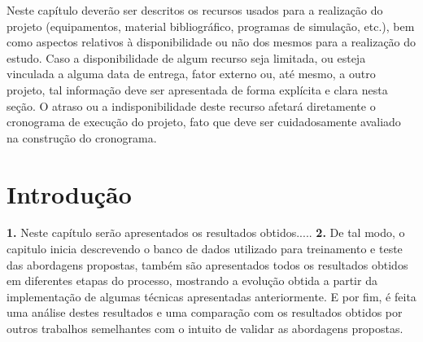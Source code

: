 {} Neste capítulo deverão ser descritos os recursos usados para a realização do projeto (equipamentos, material bibliográfico, programas de simulação, etc.), bem como aspectos relativos à disponibilidade ou não dos mesmos para a realização do estudo. Caso a disponibilidade de algum recurso seja limitada, ou esteja vinculada a alguma data de entrega, fator externo ou, até mesmo, a outro projeto, tal informação deve ser apresentada de forma explícita e clara nesta seção. O atraso ou a indisponibilidade deste recurso afetará diretamente o cronograma de execução do projeto, fato que deve ser cuidadosamente avaliado na construção do cronograma.

\section{Introdução}

\textbf{1. }
Neste capítulo serão apresentados os resultados obtidos.....
\textbf{2. }
De tal modo, o capitulo inicia descrevendo o banco de dados utilizado para treinamento e teste das abordagens propostas, 
também são apresentados todos os resultados obtidos em diferentes etapas do processo, mostrando a evolução obtida a partir da implementação de algumas técnicas apresentadas anteriormente. 
E por fim, é feita uma análise destes resultados e uma comparação com os resultados obtidos por outros trabalhos semelhantes com o intuito de validar as abordagens propostas.



